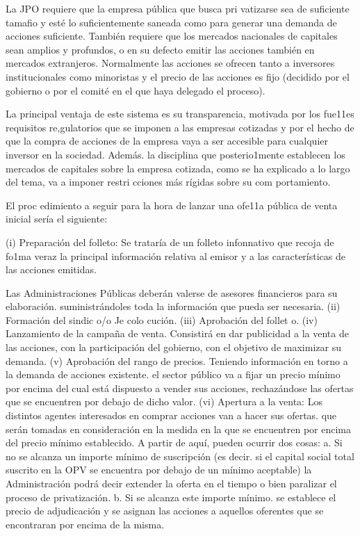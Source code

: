 \documentclass[10pt,a4paper]{article}
\begin{document}
La JPO requiere que la empresa pública que busca pri vatizarse sea de suficiente tamafio y esté lo suficientemente saneada como para generar una demanda de acciones suficiente. También requiere que los mercados nacionales de capitales sean amplios y profundos, o en su defecto emitir las acciones también en mercados extranjeros. Normalmente las acciones se ofrecen tanto a inversores institucionales como minoristas y el precio de las acciones es fijo (decidido por el gobierno o por el comité en el que haya delegado el proceso).

La principal ventaja de este sistema es su transparencia, motivada por los fue11es requisitos re,gulatorios que se imponen a las empresas cotizadas y por el hecho de que la compra de acciones de la empresa vaya a ser accesible para cualquier inversor en la sociedad. Además. la disciplina que posterio1mente establecen los mercados de capitales sobre la empresa cotizada, como se ha explicado a lo largo del tema, va a imponer restri cciones más rígidas sobre su com portamiento.

El proc edimiento a seguir para la hora de lanzar una ofe11a pública de venta inicial sería el siguiente:

(i) Preparación del folleto: Se trataría de un folleto infonnativo que recoja de fo1ma veraz la principal información relativa al emisor y a las características de las acciones emitidas.

Las Administraciones Públicas deberán valerse de asesores financieros para su elaboración. suministrándoles toda la información que pueda ser necesaria.
(ii) Formación del sindic o/o Je colo cución.
(iii) Aprobación del follet o.
(iv) Lanzamiento de la campaña de venta. Consistirá en dar publicidad a la venta de las acciones, con la participación del gobierno, con el objetivo de maximizar su demanda.
(v) Aprobación del rango de precios. Teniendo información en torno a la demanda de acciones existente. el sector público va a fijar un precio mínimo por encima del cual está dispuesto a vender sus acciones, rechazándose las ofertas que se encuentren por debajo de dicho valor.
(vi) Apertura a la venta: Los distintos agentes interesados en comprar acciones van a hacer sus ofertas. que serán tomadas en consideración en la medida en la que se encuentren por encima del precio mínimo establecido. A partir de aquí, pueden ocurrir dos cosas: a. Si no se alcanza un importe mínimo de suscripción (es decir. si el capital social total suscrito en la OPV se encuentra por debajo de un mínimo aceptable) la Administración podrá decir extender la oferta en el tiempo o bien paralizar el proceso de privatización. b. Si se alcanza este importe mínimo. se establece el precio de adjudicación y se asignan las acciones a aquellos oferentes que se encontraran por encima de la misma.
\end{document}
